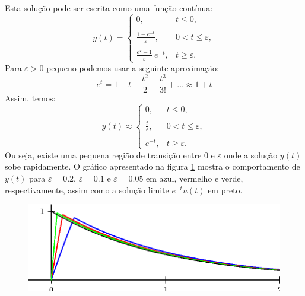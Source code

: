 Esta solução pode ser escrita como uma função contínua:
\begin{equation}y(t)=\left\{\begin{array}{ll}
0,&t\leq 0,\\~\\
\frac{1-e^{-t}}{\varepsilon},&0<t\leq \varepsilon,\\~\\
\frac{e^{\varepsilon}-1}{\varepsilon}~\!
e^{-t},&t\geq \varepsilon.
\end{array}
\right.\end{equation}
Para $\varepsilon>0$ pequeno podemos usar a seguinte aproximação:
\begin{equation}e^t=1+t+\frac{t^2}{2}+\frac{t^3}{3!}+\ldots \approx 1+t\end{equation}
Assim, temos:
\begin{equation}y(t)\approx\left\{\begin{array}{ll}
0,&t\leq 0,\\~\\
\frac{t}{\varepsilon},&0<t\leq \varepsilon,\\~\\
e^{-t},&t\geq \varepsilon.
\end{array}
\right.\end{equation}
Ou seja, existe uma pequena região de transição entre $0$ e $\varepsilon$ onde a solução $y(t)$ sobe rapidamente. O gráfico apresentado na figura \ref{concentracao_2} mostra o comportamento de $y(t)$ para $\varepsilon=0.2$, $\varepsilon=0.1$ e $\varepsilon=0.05$ em azul, vermelho e verde, respectivamente, assim como a solução limite $e^{-t}u(t)$ em preto.
\begin{figure}[!ht]
\begin{center}

\includegraphics{cap_dirac_conv/pics/figura_13} \end{center}
\caption{\label{concentracao_2}}
 \end{figure}
 
